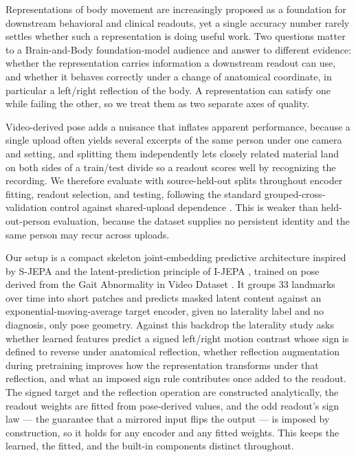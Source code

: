 \documentclass{article}
\begin{document}
Representations of body movement are increasingly proposed as a
foundation for downstream behavioral and clinical readouts, yet a single
accuracy number rarely settles whether such a representation is doing
useful work. Two questions matter to a Brain-and-Body foundation-model
audience and answer to different evidence: whether the representation
carries information a downstream readout can use, and whether it behaves
correctly under a change of anatomical coordinate, in particular a
left/right reflection of the body. A representation can satisfy one
while failing the other, so we treat them as two separate axes of
quality.

Video-derived pose adds a nuisance that inflates apparent performance,
because a single upload often yields several excerpts of the same person
under one camera and setting, and splitting them independently lets
closely related material land on both sides of a train/test divide so a
readout scores well by recognizing the recording. We therefore evaluate
with source-held-out splits throughout encoder fitting, readout
selection, and testing, following the standard grouped-cross-validation
control against shared-upload dependence
\citep{roberts2017crossvalidation}. This is weaker than held-out-person
evaluation, because the dataset supplies no persistent identity and the
same person may recur across uploads.

Our setup is a compact skeleton joint-embedding predictive architecture
inspired by S-JEPA \citep{abdelfattah2024sjepa} and the
latent-prediction principle of I-JEPA \citep{assran2023ijepa}, trained
on pose derived from the Gait Abnormality in Video Dataset
\citep{ranjan2025gavd}. It groups 33 landmarks over time into short
patches and predicts masked latent content against an
exponential-moving-average target encoder, given no laterality label and
no diagnosis, only pose geometry. Against this backdrop the laterality
study asks whether learned features predict a signed left/right motion
contrast whose sign is defined to reverse under anatomical reflection,
whether reflection augmentation during pretraining improves how the
representation transforms under that reflection, and what an imposed
sign rule contributes once added to the readout. The signed target and
the reflection operation are constructed analytically, the readout
weights are fitted from pose-derived values, and the odd readout's sign
law --- the guarantee that a mirrored input flips the output --- is
imposed by construction, so it holds for any encoder and any fitted
weights. This keeps the learned, the fitted, and the built-in components
distinct throughout.
\end{document}
